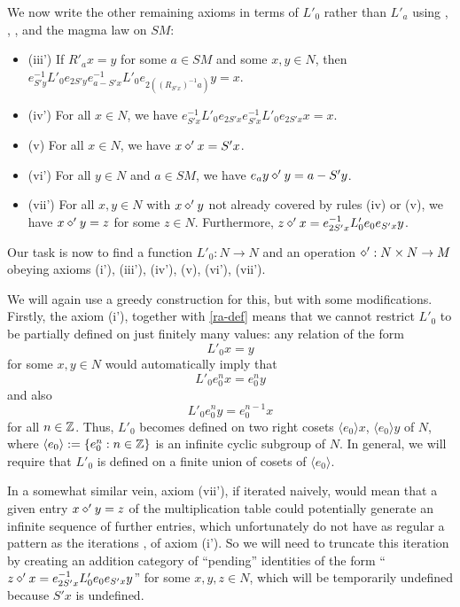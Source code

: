 We now write the other remaining axioms in terms of $L'_0$ rather than $L'_a$ using , , , and the magma law on $SM$:
\begin{itemize}
\item (iii')  If $R'_a x = y$ for some $a \in SM$ and some $x,y \in N$, then $e_{S'y}^{-1} L'_0 e_{2S'y} e_{a - S'x}^{-1} L'_0 e_{2((R_{S'x})^{-1} a)} y = x$.
\item (iv')  For all $x \in N$, we have $e_{S'x}^{-1} L'_0 e_{2S'x} e_{S'x}^{-1} L'_0 e_{2S'x} x = x$.
\item (v)  For all $x \in N$, we have $x \diamond' x = S'x$.
\item (vi')  For all $y \in N$ and $a \in SM$, we have $e_a y \diamond' y = a - S'y$.
\item (vii')  For all $x,y \in N$ with $x \diamond' y$ not already covered by rules (iv) or (v), we have $x \diamond' y = z$ for some $z \in N$.  Furthermore, $z \diamond' x = e_{2S'x}^{-1} L'_0 e_0 e_{S'x} y$.
\end{itemize}

Our task is now to find a function $L'_0: N \to N$ and an operation $\diamond': N \times N \to M$ obeying axioms (i'), (iii'), (iv'), (v), (vi'), (vii').

We will again use a greedy construction for this, but with some modifications.  Firstly, the axiom (i'), together with \eqref{ra-def} means that we cannot restrict $L'_0$ to be partially defined on just finitely many values: any relation of the form
$$ L'_0 x = y$$
for some $x,y \in N$ would automatically imply that
\begin{equation}\label{itero}
 L'_0 e_0^n x = e_0^n y
\end{equation}
and also
\begin{equation}\label{itero-2}
  L'_0 e_0^n y = e_0^{n-1} x
\end{equation}
for all $n \in \mathbb{Z}$.  Thus, $L'_0$ becomes defined on two right cosets $\langle e_0 \rangle x$, $\langle e_0 \rangle y$ of $N$, where $\langle e_0 \rangle := \{ e_0^n: n \in \mathbb{Z}\}$ is an infinite cyclic subgroup of $N$.  In general, we will require that $L'_0$ is defined on a finite union of cosets of $\langle e_0\rangle$.

In a somewhat similar vein, axiom (vii'), if iterated naively, would mean that a given entry $x \diamond' y = z$ of the multiplication table could potentially generate an infinite sequence of further entries, which unfortunately do not have as regular a pattern as the iterations ,  of axiom (i').  So we will need to truncate this iteration by creating an addition category of ``pending'' identities of the form ``$z \diamond' x = e_{2S'x}^{-1} L'_0 e_0 e_{S'x} y$'' for some $x,y,z \in N$, which will be temporarily undefined because $S'x$ is undefined.

